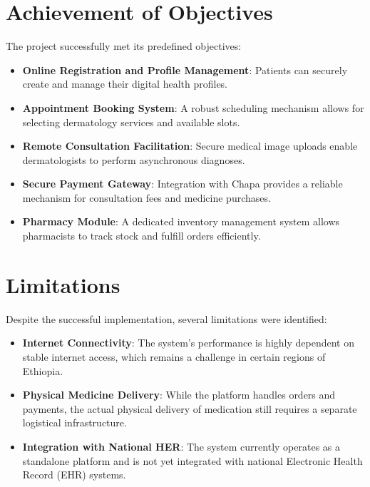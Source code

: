\documentclass[12pt,a4paper]{report}
\begin{document}
\section{Achievement of Objectives}
The project successfully met its predefined objectives:
\begin{itemize}
    \item \textbf{Online Registration and Profile Management}: Patients can securely create and manage their digital health profiles.
    \item \textbf{Appointment Booking System}: A robust scheduling mechanism allows for selecting dermatology services and available slots.
    \item \textbf{Remote Consultation Facilitation}: Secure medical image uploads enable dermatologists to perform asynchronous diagnoses.
    \item \textbf{Secure Payment Gateway}: Integration with Chapa provides a reliable mechanism for consultation fees and medicine purchases.
    \item \textbf{Pharmacy Module}: A dedicated inventory management system allows pharmacists to track stock and fulfill orders efficiently.
\end{itemize}

\section{Limitations}
Despite the successful implementation, several limitations were identified:
\begin{itemize}
    \item \textbf{Internet Connectivity}: The system’s performance is highly dependent on stable internet access, which remains a challenge in certain regions of Ethiopia.
    \item \textbf{Physical Medicine Delivery}: While the platform handles orders and payments, the actual physical delivery of medication still requires a separate logistical infrastructure.
    \item \textbf{Integration with National HER}: The system currently operates as a standalone platform and is not yet integrated with national Electronic Health Record (EHR) systems.
\end{itemize}
\end{document}
